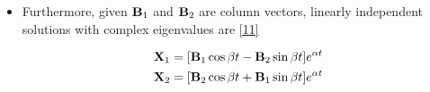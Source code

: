 \documentclass[12pt]{article}
\begin{document}
\begin{itemize}
  \item Furthermore, given $\bold{B}_1$ and $\bold{B}_2$ are column vectors, linearly independent solutions with complex eigenvalues are \eqref{11}

    \begin{equation}
      \begin{split}
      \bold{X}_1=[\bold{B}_1\cos\beta t-\bold{B}_2\sin\beta t]e^{\alpha t}\\
      \bold{X}_2=[\bold{B}_2\cos\beta t+\bold{B}_1\sin\beta t]e^{\alpha t}
    \end{split}
      \label{11}
    \end{equation}

\end{itemize}
\end{document}
